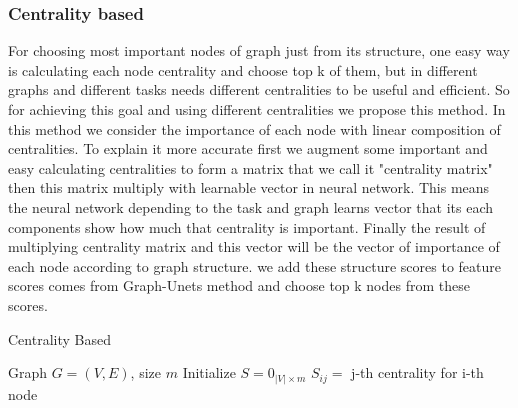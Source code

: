 \documentclass[nohyperref]{article}
\theoremstyle{plain}
\theoremstyle{definition}
\theoremstyle{remark}
\begin{document}
\subsubsection{Centrality based}
For choosing most important nodes of graph just from its structure, one easy way is calculating each node centrality and choose top k of them, but in different graphs and different tasks needs different centralities to be useful and efficient. So for achieving this goal and using different centralities we propose this method. In this method we consider the importance of each node with linear composition of centralities. To explain it more accurate first we augment some important and easy calculating centralities to form a matrix that we call it "centrality matrix" then this matrix multiply with learnable vector in neural network. This means the neural network depending to the task and graph learns vector that its each components show how much that centrality is important. Finally the result of multiplying centrality matrix and this vector will be the vector of importance of each node according to graph structure. we add these structure scores to feature scores comes from Graph-Unets method and choose top k nodes from these scores.
\begin{algorithm}[tb]
	\caption{Centrality Based }
	\label{alg:example}
	\begin{algorithmic}
		 Graph $G=(V, E)$, size $m$
		\STATE Initialize $S = 0_{|V| \times m}$
		\STATE $S_{ij} =$ j-th centrality for i-th node
		\ENDFOR
		\ENDFOR
	\end{algorithmic}
\end{algorithm}
\end{document}
